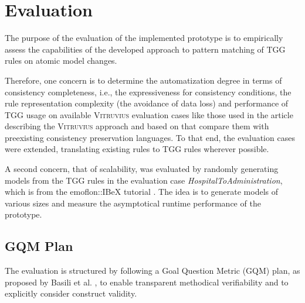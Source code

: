 
\chapter{Evaluation}
\label{ch:Evaluation}
The purpose of the evaluation of the implemented prototype is to empirically assess the capabilities of the developed approach to pattern matching of TGG rules on atomic model changes.

Therefore, one concern is to determine the automatization degree in terms of consistency completeness, i.e., the expressiveness for consistency conditions, the rule representation complexity (the avoidance of data loss) and performance of TGG usage on available \textsc{Vitruvius} evaluation cases like those used in the article describing the \textsc{Vitruvius} approach \cite{VitruviusKlare2021} and based on that compare them with preexisting consistency preservation languages.
To that end, the evaluation cases were extended, translating existing rules to TGG rules wherever possible.

A second concern, that of scalability, was evaluated by randomly generating models from the TGG rules in the evaluation case \emph{HospitalToAdministration}, which is from the emoflon::IBeX tutorial \cite{emoflon_tutorial, noauthor_github_emoflon_tutorial}.
The idea is to generate models of various sizes and measure the asymptotical runtime performance of the prototype.

\section{GQM Plan}
\label{sec:Evaluation:GQMPlan}
The evaluation is structured by following a Goal Question Metric (GQM) plan, as proposed by Basili et al. \cite{basili_methodology_gqm_1984}, to enable transparent methodical verifiability and to explicitly consider construct validity.

